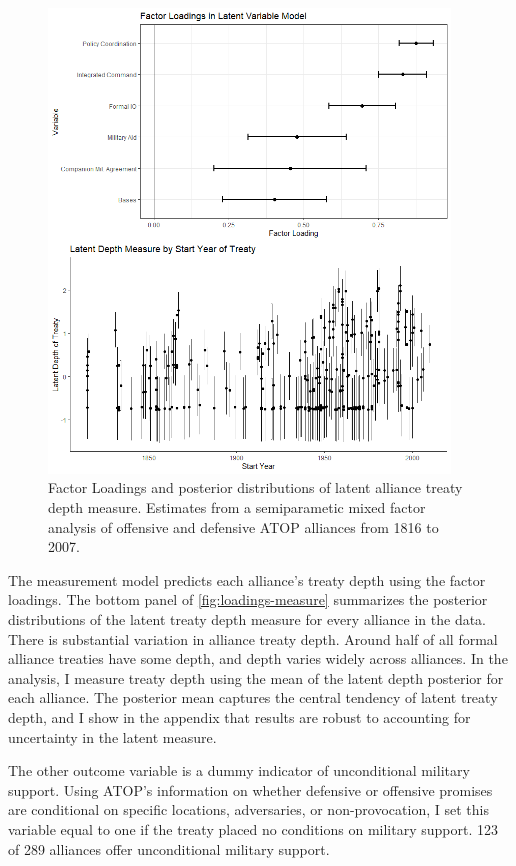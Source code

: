 \documentclass[12pt]{article}
\begin{document}
\begin{figure}[hbtp]
\centering
\includegraphics[width=0.95\textwidth]{../figures/loadings-measure.png}
\caption{Factor Loadings and posterior distributions of latent alliance treaty depth measure. Estimates from a semiparametic mixed factor analysis of offensive and defensive ATOP alliances from 1816 to 2007.}
\label{fig:loadings-measure}
\end{figure}


The measurement model predicts each alliance's treaty depth using the factor loadings. 
The bottom panel of \autoref{fig:loadings-measure} summarizes the posterior distributions of the latent treaty depth measure for every alliance in the data. 
There is substantial variation in alliance treaty depth. 
Around half of all formal alliance treaties have some depth, and depth varies widely across alliances.
In the analysis, I measure treaty depth using the mean of the latent depth posterior for each alliance. 
The posterior mean captures the central tendency of latent treaty depth, and I show in the appendix that results are robust to accounting for uncertainty in the latent measure. 


The other outcome variable is a dummy indicator of unconditional military support. 
Using ATOP's information on whether defensive or offensive promises are conditional on specific locations, adversaries, or non-provocation, I set this variable equal to one if the treaty placed no conditions on military support.
123 of 289 alliances offer unconditional military support. 
\end{document}
